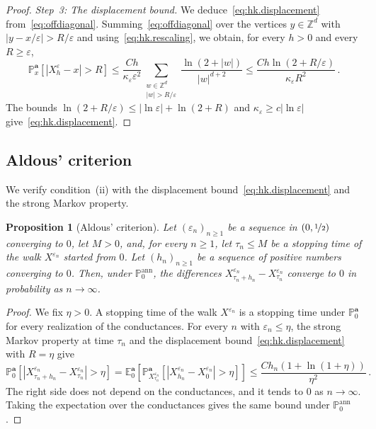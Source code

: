 \documentclass[11pt]{amsart}
\newtheorem{proposition}[theorem]{Proposition}
\numberwithin{equation}{section}
\newcommand{\Z}{\mathbb{Z}}
\newcommand{\E}{\mathbb{E}}
\newcommand{\PP}{\mathbb{P}}
\newcommand{\ba}{\mathbf{a}}
\newcommand{\eps}{\varepsilon}
\newcommand{\nf}{\nicefrac}
\begin{document}
\begin{proof}
\smallskip

\emph{Step~3: The displacement bound.}
We deduce~\eqref{eq:hk.displacement} from~\eqref{eq:offdiagonal}.
Summing~\eqref{eq:offdiagonal} over the vertices $y \in \Z^d$ with $|y - x/\eps| > R/\eps$ and using~\eqref{eq:hk.rescaling}, we obtain, for every $h > 0$ and every $R \geq \eps$,
\begin{equation*}
    \PP^\ba_x \left[ |X^\eps_h - x| > R \right] \leq \frac{C h}{\kappa_\eps \eps^2} \sum_{\substack{w \in \Z^d \\ |w| > R/\eps}} \frac{\ln(2 + |w|)}{|w|^{d+2}} \leq \frac{C h \ln(2 + R/\eps)}{\kappa_\eps R^2}\,.
\end{equation*}
The bounds $\ln(2 + R/\eps) \leq |\ln \eps| + \ln(2 + R)$ and $\kappa_\eps \geq c |\ln \eps|$ give~\eqref{eq:hk.displacement}.
\end{proof}

\subsection{Aldous' criterion} \label{sec:tightness}

We verify condition~(ii) with the displacement bound~\eqref{eq:hk.displacement} and the strong Markov property.

\begin{proposition}[Aldous' criterion] \label{prop:aldous}
Let $(\eps_n)_{n \geq 1}$ be a sequence in $(0, \nf12)$ converging to $0$, let $M > 0$, and, for every $n \geq 1$, let $\tau_n \leq M$ be a stopping time of the walk $X^{\eps_n}$ started from $0$.
Let $(h_n)_{n \geq 1}$ be a sequence of positive numbers converging to $0$.
Then, under $\PP^{\mathrm{ann}}_0$, the differences $X^{\eps_n}_{\tau_n + h_n} - X^{\eps_n}_{\tau_n}$ converge to $0$ in probability as $n \to \infty$.
\end{proposition}

\begin{proof}
We fix $\eta > 0$.
A stopping time of the walk $X^{\eps_n}$ is a stopping time under $\PP^\ba_0$ for every realization of the conductances.
For every $n$ with $\eps_n \leq \eta$, the strong Markov property at time $\tau_n$ and the displacement bound~\eqref{eq:hk.displacement} with $R = \eta$ give
\begin{equation*}
    \PP^\ba_0 \left[ |X^{\eps_n}_{\tau_n + h_n} - X^{\eps_n}_{\tau_n}| > \eta \right] = \E^\ba_0 \left[ \PP^\ba_{X^{\eps_n}_{\tau_n}} \left[ |X^{\eps_n}_{h_n} - X^{\eps_n}_0| > \eta \right] \right] \leq \frac{C h_n (1 + \ln(1 + \eta))}{\eta^2}\,.
\end{equation*}
The right side does not depend on the conductances, and it tends to $0$ as $n \to \infty$.
Taking the expectation over the conductances gives the same bound under $\PP^{\mathrm{ann}}_0$.
\end{proof}
\end{document}
